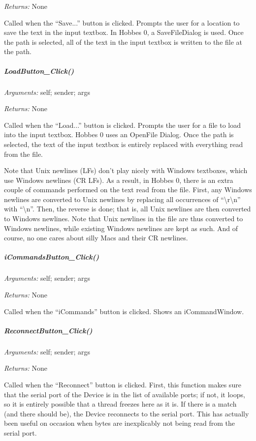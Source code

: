 \documentclass[12pt,letterpaper]{article}
\begin{document}
\emph{Returns:} None

Called when the ``Save...'' button is clicked. Prompts the user for a location to save the text in the input textbox. In Hobbes 0, a SaveFileDialog is used. Once the path is selected, all of the text in the input textbox is written to the file at the path.



%
%
\subparagraph{LoadButton\_Click()}
\label{4.3.1.3.6}

\emph{Arguments:} self; sender; args

\emph{Returns:} None

Called when the ``Load...'' button is clicked. Prompts the user for a file to load into the input textbox. Hobbes 0 uses an OpenFile Dialog. Once the path is selected, the text of the input textbox is entirely replaced with everything read from the file.

Note that Unix newlines (LFs) don't play nicely with Windows textboxes, which use Windows newlines (CR LFs). As a result, in Hobbes 0, there is an extra couple of commands performed on the text read from the file. First, any Windows newlines are converted to Unix newlines by replacing all occurrences of ``\textbackslash r\textbackslash n'' with ``\textbackslash n''. Then, the reverse is done; that is, all Unix newlines are then converted to Windows newlines. Note that Unix newlines in the file are thus converted to Windows newlines, while existing Windows newlines are kept as such. And of course, no one cares about silly Macs and their CR newlines.



%
%
\subparagraph{iCommandsButton\_Click()}
\label{4.3.1.3.7}

\emph{Arguments:} self; sender; args

\emph{Returns:} None

Called when the ``iCommands'' button is clicked. Shows an iCommandWindow.



%
%
\subparagraph{ReconnectButton\_Click()}
\label{4.3.1.3.8}

\emph{Arguments:} self; sender; args

\emph{Returns:} None

Called when the ``Reconnect'' button is clicked. First, this function makes sure that the serial port of the Device is in the list of available ports; if not, it loops, so it is entirely possible that a thread freezes here as it is. If there is a match (and there should be), the Device reconnects to the serial port. This has actually been useful on occasion when bytes are inexplicably not being read from the serial port.
\end{document}
